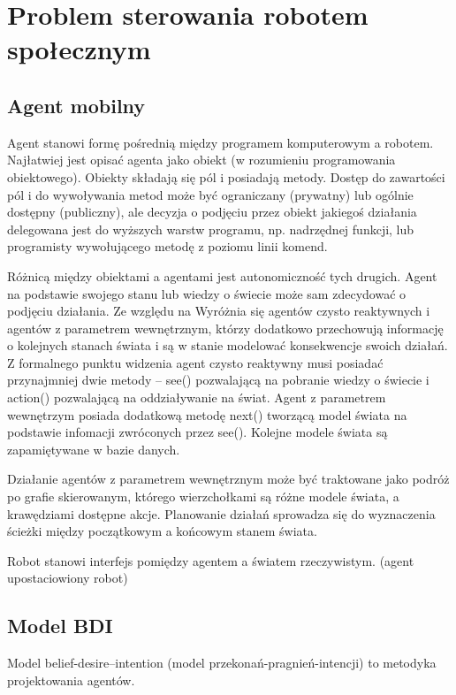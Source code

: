 \chapter{Problem sterowania robotem społecznym}

\section{Agent mobilny}
Agent stanowi formę pośrednią między programem komputerowym a robotem. Najłatwiej jest opisać agenta jako obiekt (w rozumieniu programowania obiektowego). Obiekty składają się pól i posiadają metody. Dostęp do zawartości pól i do wywoływania metod może być ograniczany (prywatny) lub ogólnie dostępny (publiczny), ale decyzja o podjęciu przez obiekt jakiegoś działania delegowana jest do wyższych warstw programu, np. nadrzędnej funkcji, lub programisty wywołującego metodę z poziomu linii komend. 

Różnicą między obiektami a agentami jest autonomiczność tych drugich. Agent na podstawie swojego stanu lub wiedzy o świecie może sam zdecydować o podjęciu działania. Ze względu na Wyróżnia się agentów czysto reaktywnych i agentów z parametrem wewnętrznym, którzy dodatkowo przechowują informację o kolejnych stanach świata i są w stanie modelować konsekwencje swoich działań. Z formalnego punktu widzenia agent czysto reaktywny musi posiadać przynajmniej dwie metody – see() pozwalającą na pobranie wiedzy o świecie i action() pozwalającą na oddziaływanie na świat. Agent z parametrem wewnętrzym posiada dodatkową metodę next() tworzącą model świata na podstawie infomacji zwróconych przez see(). Kolejne modele świata są zapamiętywane w bazie danych.  

Działanie agentów z parametrem wewnętrznym może być traktowane jako podróż po grafie skierowanym, którego wierzchołkami są różne modele świata, a krawędziami dostępne akcje. Planowanie działań sprowadza się do wyznaczenia ścieżki między początkowym a końcowym stanem świata.

Robot stanowi interfejs pomiędzy agentem a światem rzeczywistym.  (agent upostaciowiony robot)

\section{Model BDI}
Model belief-desire–intention (model przekonań-pragnień-intencji) to metodyka projektowania agentów. 

